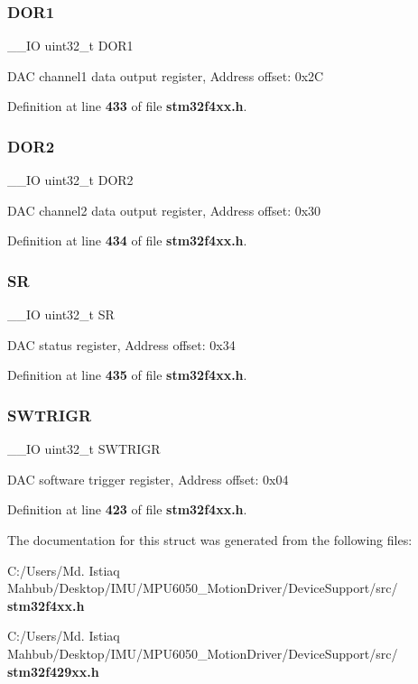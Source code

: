 \subsubsection{D\+O\+R1}
{\footnotesize\ttfamily \+\_\+\+\_\+\+IO uint32\+\_\+t D\+O\+R1}

D\+AC channel1 data output register, Address offset\+: 0x2C 

Definition at line \textbf{ 433} of file \textbf{ stm32f4xx.\+h}.

\mbox{\label{structDAC__TypeDef_aba9fb810b0cf6cbc1280c5c63be2418b}} 
\subsubsection{D\+O\+R2}
{\footnotesize\ttfamily \+\_\+\+\_\+\+IO uint32\+\_\+t D\+O\+R2}

D\+AC channel2 data output register, Address offset\+: 0x30 

Definition at line \textbf{ 434} of file \textbf{ stm32f4xx.\+h}.

\mbox{\label{structDAC__TypeDef_af6aca2bbd40c0fb6df7c3aebe224a360}} 
\subsubsection{SR}
{\footnotesize\ttfamily \+\_\+\+\_\+\+IO uint32\+\_\+t SR}

D\+AC status register, Address offset\+: 0x34 

Definition at line \textbf{ 435} of file \textbf{ stm32f4xx.\+h}.

\mbox{\label{structDAC__TypeDef_a896bbb7153af0b67ad772360feaceeb4}} 
\subsubsection{S\+W\+T\+R\+I\+GR}
{\footnotesize\ttfamily \+\_\+\+\_\+\+IO uint32\+\_\+t S\+W\+T\+R\+I\+GR}

D\+AC software trigger register, Address offset\+: 0x04 

Definition at line \textbf{ 423} of file \textbf{ stm32f4xx.\+h}.



The documentation for this struct was generated from the following files\+:\begin{DoxyCompactItemize}
\item 
C\+:/\+Users/\+Md. Istiaq Mahbub/\+Desktop/\+I\+M\+U/\+M\+P\+U6050\+\_\+\+Motion\+Driver/\+Device\+Support/src/\textbf{ stm32f4xx.\+h}\item 
C\+:/\+Users/\+Md. Istiaq Mahbub/\+Desktop/\+I\+M\+U/\+M\+P\+U6050\+\_\+\+Motion\+Driver/\+Device\+Support/src/\textbf{ stm32f429xx.\+h}\end{DoxyCompactItemize}
